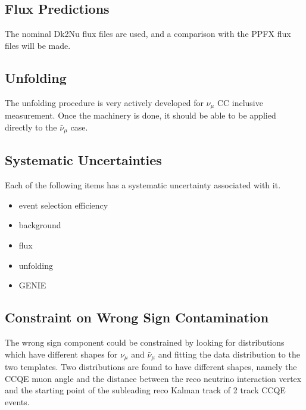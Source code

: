 \documentclass[12pt,a4paper,final]{iopart}
\begin{document}
\subsection{Flux Predictions}
The nominal Dk2Nu flux files are used, and a comparison with the PPFX flux files will be made.

\subsection{Unfolding}
The unfolding procedure is very actively developed for $\nu_\mu$ CC inclusive measurement. Once the machinery is done, it should be able to be applied directly to the $\bar{\nu}_\mu$ case.

\subsection{Systematic Uncertainties}
Each of the following items has a systematic uncertainty associated with it.
\begin{itemize}
  \item event selection efficiency
  \item background
  \item flux
  \item unfolding
  \item GENIE
\end{itemize}

\subsection{Constraint on Wrong Sign Contamination}
The wrong sign component could be constrained by looking for distributions which have different shapes for $\nu_\mu$ and $\bar{\nu}_\mu$ and fitting the data distribution to the two templates. Two distributions are found to have different shapes, namely the CCQE muon angle and the distance between the reco neutrino interaction vertex and the starting point of the subleading reco Kalman track of 2 track CCQE events.
\end{document}
